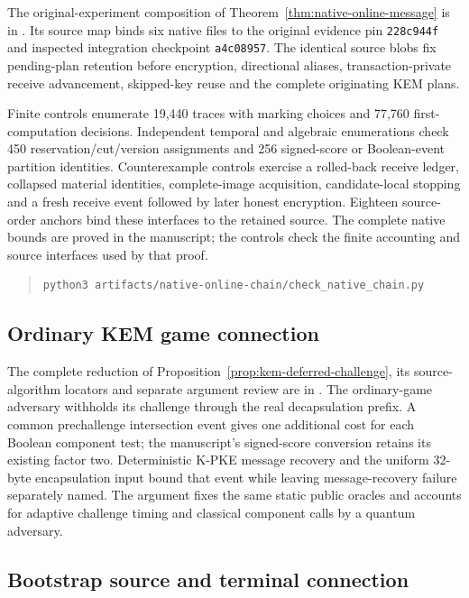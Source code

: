 The original-experiment composition of
Theorem~\ref{thm:native-online-message} is in
. Its source map binds six native
files to the original evidence pin \texttt{228c944f} and inspected
integration checkpoint \texttt{a4c08957}. The identical source blobs
fix pending-plan retention before encryption, directional aliases,
transaction-private receive advancement, skipped-key reuse and the
complete originating KEM plans.

Finite controls enumerate 19,440 traces with marking choices and
77,760 first-computation decisions. Independent temporal and algebraic
enumerations check 450 reservation/cut/version assignments and 256
signed-score or Boolean-event partition identities. Counterexample
controls exercise a rolled-back receive ledger, collapsed material
identities, complete-image acquisition, candidate-local stopping and
a fresh receive event followed by later honest encryption. Eighteen
source-order anchors bind these interfaces to the retained source.
The complete native bounds are proved in the manuscript; the controls
check the finite accounting and source interfaces used by that proof.
\begin{quote}
\small
\begin{verbatim}
python3 artifacts/native-online-chain/check_native_chain.py
\end{verbatim}
\end{quote}

\subsection{Ordinary KEM game connection}
\label{app:kem-ordinary-bridge}

The complete reduction of
Proposition~\ref{prop:kem-deferred-challenge}, its source-algorithm
locators and separate argument review are in
. The ordinary-game adversary withholds
its challenge through the real decapsulation prefix. A common
prechallenge intersection event gives one additional cost for each
Boolean component test; the manuscript's signed-score conversion
retains its existing factor two. Deterministic K-PKE message recovery
and the uniform 32-byte encapsulation input bound that event while
leaving message-recovery failure separately named. The argument fixes
the same static public oracles and accounts for adaptive challenge
timing and classical component calls by a quantum adversary.


\subsection{Bootstrap source and terminal connection}
\label{app:bootstrap-artifacts}

